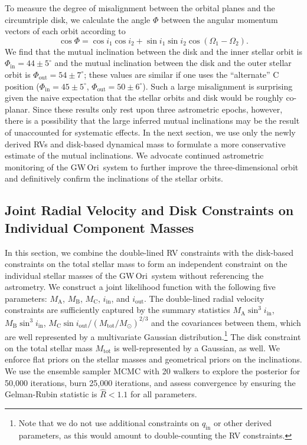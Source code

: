 \documentclass[twocolumn]{aastex61}
\newcommand{\obj}{GW\,Ori}
\begin{document}
To measure the degree of misalignment between the orbital planes and the circumtriple disk, we calculate the angle $\Phi$ between the angular momentum vectors of each orbit according to \citet{fekel81}
\begin{equation}
  \cos \Phi = \cos i_1 \cos i_2 + \sin i_1 \sin i_2 \cos(\Omega_1 - \Omega_2).
\end{equation}
We find that the mutual inclination between the disk and the inner stellar orbit is $\Phi_\mathrm{in} = 44\pm5^\circ$ and the mutual inclination between the disk and the outer stellar orbit is $\Phi_\mathrm{out} = 54\pm 7^\circ$; these values are similar if one uses the ``alternate'' C position ($\Phi_\mathrm{in} = 45 \pm 5^\circ$, $\Phi_\mathrm{out} = 50 \pm 6^\circ$). Such a large misalignment is surprising given the naive expectation that the stellar orbits and disk would be roughly co-planar.  Since these results only rest upon three astrometric epochs, however, there is a possibility that the large inferred mutual inclinations may be the result of unaccounted for systematic effects. In the next section, we use only the newly derived RVs and disk-based dynamical mass to formulate a more conservative estimate of the mutual inclinations. We advocate continued astrometric monitoring of the \obj\ system to further improve the three-dimensional orbit and definitively confirm the inclinations of the stellar orbits.

\subsection{Joint Radial Velocity and Disk Constraints on Individual Component Masses}
\label{sec:joint}
In this section, we combine the double-lined RV constraints with the disk-based constraints on the total stellar mass to form an independent constraint on the individual stellar masses of the \obj\ system without referencing the \citet{berger11} astrometry. We construct a joint likelihood function with the following five parameters: $M_\mathrm{A}$, $M_\mathrm{B}$, $M_\mathrm{C}$, $i_\mathrm{in}$, and $i_\mathrm{out}$.
The double-lined radial velocity constraints are sufficiently captured by the summary statistics $M_\mathrm{A} \sin^3 i_\mathrm{in}$, $M_\mathrm{B} \sin^3 i_\mathrm{in}$, $M_\mathrm{C} \sin i_\mathrm{out} / (M_\mathrm{tot} / M_\odot)^{2/3}$ and the covariances between them, which are well represented by a multivariate Gaussian distribution.\footnote{Note that we do not use additional constraints on $q_\mathrm{in}$ or other derived parameters, as this would amount to double-counting the RV constraints.} The disk constraint on the total stellar mass $M_\mathrm{tot}$ is well-represented by a Gaussian, as well.
We enforce flat priors on the stellar masses and geometrical priors on the inclinations. We use the ensemble sampler MCMC \citep{goodman10,foreman-mackey13} with 20 walkers to explore the posterior for 50,000 iterations, burn 25,000 iterations, and assess convergence by ensuring the Gelman-Rubin statistic \citep{gelman14} is $\hat{R} < 1.1$ for all parameters.
\end{document}
